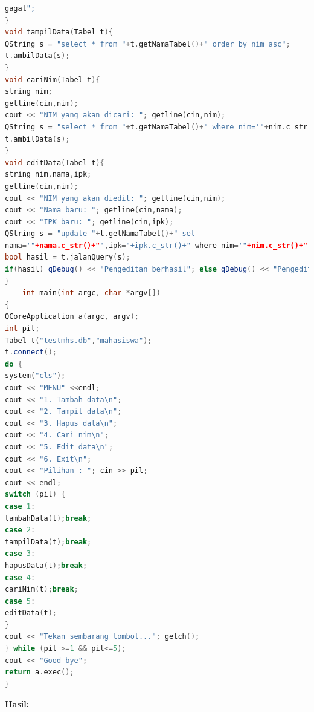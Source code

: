 \begin{enumerate}
\begin{lstlisting}[language=c++, caption= Pembuatan manipulasi data pada SQLite dengan menggunakan menu]
gagal";
}
void tampilData(Tabel t){
QString s = "select * from "+t.getNamaTabel()+" order by nim asc";
t.ambilData(s);
}
void cariNim(Tabel t){
string nim;
getline(cin,nim);
cout << "NIM yang akan dicari: "; getline(cin,nim);
QString s = "select * from "+t.getNamaTabel()+" where nim='"+nim.c_str()+"'";
t.ambilData(s);
}
void editData(Tabel t){
string nim,nama,ipk;
getline(cin,nim);
cout << "NIM yang akan diedit: "; getline(cin,nim);
cout << "Nama baru: "; getline(cin,nama);
cout << "IPK baru: "; getline(cin,ipk);
QString s = "update "+t.getNamaTabel()+" set
nama='"+nama.c_str()+"',ipk="+ipk.c_str()+" where nim='"+nim.c_str()+"'";
bool hasil = t.jalanQuery(s);
if(hasil) qDebug() << "Pengeditan berhasil"; else qDebug() << "Pengeditan gagal";
}
    int main(int argc, char *argv[])
{
QCoreApplication a(argc, argv);
int pil;
Tabel t("testmhs.db","mahasiswa");
t.connect();
do {
system("cls");
cout << "MENU" <<endl;
cout << "1. Tambah data\n";
cout << "2. Tampil data\n";
cout << "3. Hapus data\n";
cout << "4. Cari nim\n";
cout << "5. Edit data\n";
cout << "6. Exit\n";
cout << "Pilihan : "; cin >> pil;
cout << endl;
switch (pil) {
case 1:
tambahData(t);break;
case 2:
tampilData(t);break;
case 3:
hapusData(t);break;
case 4:
cariNim(t);break;
case 5:
editData(t);
}
cout << "Tekan sembarang tombol..."; getch();
} while (pil >=1 && pil<=5);
cout << "Good bye";
return a.exec();
}
\end{lstlisting}
\end{enumerate}

\textbf{Hasil:}

